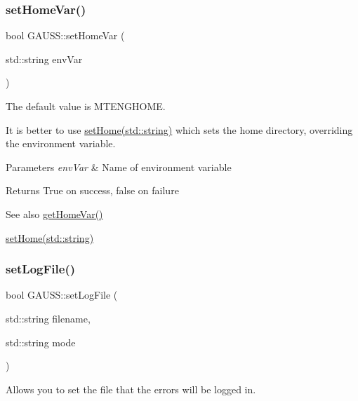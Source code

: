 \subsubsection{\texorpdfstring{set\+Home\+Var()}{setHomeVar()}}
{\footnotesize\ttfamily bool G\+A\+U\+S\+S\+::set\+Home\+Var (\begin{DoxyParamCaption}\item[{std\+::string}]{env\+Var }\end{DoxyParamCaption})}



The default value is {\ttfamily M\+T\+E\+N\+G\+H\+O\+ME}. 

It is better to use \hyperlink{class_g_a_u_s_s_ac34645a05f3aca7d56d11d0b895fb33a}{set\+Home(std\+::string)} which sets the home directory, overriding the environment variable.


\begin{DoxyParams}{Parameters}
{\em env\+Var} & Name of environment variable \\
\hline
\end{DoxyParams}
\begin{DoxyReturn}{Returns}
True on success, false on failure
\end{DoxyReturn}
\begin{DoxySeeAlso}{See also}
\hyperlink{class_g_a_u_s_s_ab8df3c28586620495a09af82e4be9ab5}{get\+Home\+Var()} 

\hyperlink{class_g_a_u_s_s_ac34645a05f3aca7d56d11d0b895fb33a}{set\+Home(std\+::string)} 
\end{DoxySeeAlso}
\mbox{\label{class_g_a_u_s_s_aeec13d5fa3abe9e9b7836cee87edf5b8}} 
\subsubsection{\texorpdfstring{set\+Log\+File()}{setLogFile()}}
{\footnotesize\ttfamily bool G\+A\+U\+S\+S\+::set\+Log\+File (\begin{DoxyParamCaption}\item[{std\+::string}]{filename,  }\item[{std\+::string}]{mode }\end{DoxyParamCaption})}



Allows you to set the file that the errors will be logged in. 

